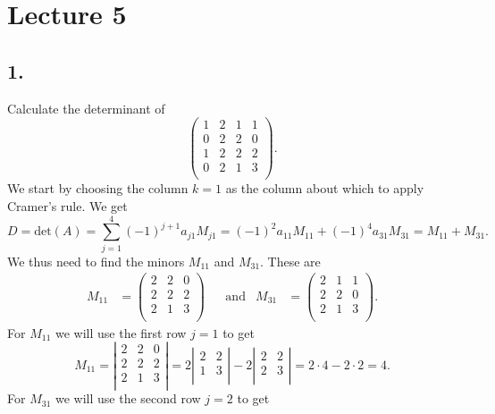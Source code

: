 \section*{Lecture 5}

\subsection*{1.}
Calculate the determinant of
\[ 
\begin{pmatrix}
1 & 2 & 1 & 1\\
0 & 2 & 2 & 0\\
1 & 2 & 2 & 2\\
0 & 2 & 1 & 3\\
\end{pmatrix}
.\]
\bigbreak
We start by choosing the column $k = 1$ as the column about which to apply Cramer's rule. We get
\[ 
D = \mathrm{det}(A) = \sum_{j = 1}^{4} (-1)^{j+1} a_{j1} M_{j1} = (-1)^{2} a_{11} M_{11} + (-1)^{4} a_{31}M_{31} = M_{11} + M_{31}  
.\]
We thus need to find the minors $M_{11}$ and $M_{31}$. These are
\begin{align*}
  M_{11} &= \begin{pmatrix}
2 & 2 & 0\\
2 & 2 & 2\\
2 & 1 & 3\\
\end{pmatrix} &&\text{and} & M_{31} &= \begin{pmatrix}
2 & 1 & 1\\
2 & 2 & 0\\
2 & 1 & 3\\
\end{pmatrix}
.\end{align*}
For $M_{11}$ we will use the first row $j = 1$ to get
\[ 
M_{11} = \left| \begin{array}{ccc}
2 & 2 & 0\\
2 & 2 & 2\\
2 & 1 & 3\\
\end{array} \right| = 2 \left| \begin{array} {cc}
2 & 2\\
1 & 3\\
\end{array} \right| - 2 \left| \begin{array} {cc}
2 & 2\\
2 & 3\\
\end{array} \right| = 2 \cdot 4 - 2 \cdot 2 = 4
.\]
For $M_{31}$ we will use the second row $j = 2$ to get
